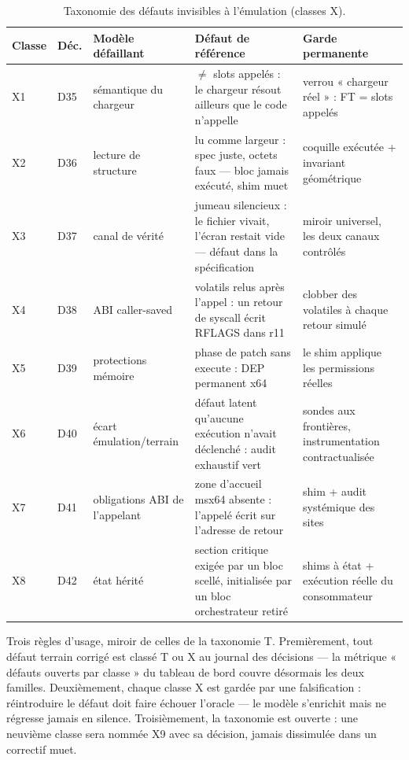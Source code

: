 \begin{table}[htbp]
\centering\footnotesize
\caption{Taxonomie des défauts invisibles à l'émulation (classes X).}
\label{tab:taxonomieX}
\begin{tabularx}{\textwidth}{@{}l l Y Y Y@{}}
\toprule
\textbf{Classe} & \textbf{Déc.} & \textbf{Modèle défaillant} & \textbf{Défaut de
référence} & \textbf{Garde permanente} \\
\midrule
X1 & D35 & sémantique du chargeur &  $\neq$ slots appelés : le chargeur
résout ailleurs que le code n'appelle & verrou « chargeur réel » : FT = slots appelés \\
X2 & D36 & lecture de structure &  lu comme largeur : spec juste, octets
faux — bloc jamais exécuté, shim muet & coquille exécutée + invariant géométrique \\
X3 & D37 & canal de vérité & jumeau silencieux : le fichier vivait, l'écran restait vide —
défaut dans la spécification & miroir universel, les deux canaux contrôlés \\
X4 & D38 & ABI caller-saved & volatils relus après l'appel : un retour de syscall écrit
RFLAGS dans r11 & clobber des volatiles à chaque retour simulé \\
X5 & D39 & protections mémoire & phase de patch  sans execute : DEP
permanent x64 & le shim applique les permissions réelles \\
X6 & D40 & écart émulation/terrain & défaut latent qu'aucune exécution n'avait déclenché :
audit exhaustif vert & sondes aux frontières, instrumentation contractualisée \\
X7 & D41 & obligations ABI de l'appelant & zone d'accueil msx64 absente : l'appelé écrit
sur l'adresse de retour & shim  + audit systémique des sites \\
X8 & D42 & état hérité & section critique exigée par un bloc scellé, initialisée par un
bloc orchestrateur retiré & shims à état + exécution réelle du consommateur \\
\bottomrule
\end{tabularx}
\end{table}

Trois règles d'usage, miroir de celles de la taxonomie T. Premièrement, tout défaut terrain
corrigé est classé T ou X au journal des décisions — la métrique « défauts ouverts par
classe » du tableau de bord couvre désormais les deux familles. Deuxièmement, chaque classe
X est gardée par une falsification : réintroduire le défaut doit faire échouer l'oracle —
le modèle s'enrichit mais ne régresse jamais en silence. Troisièmement, la taxonomie est
ouverte : une neuvième classe sera nommée X9 avec sa décision, jamais dissimulée dans un
correctif muet.

